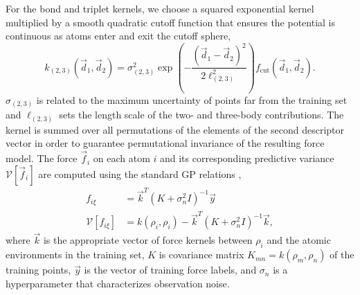 \documentclass[%
superscriptaddress,
preprint,
linenumbers,
amsmath,amssymb,
aps,
prl,
]{revtex4-1}
\begin{document}
For the bond and triplet kernels, we choose a squared exponential kernel multiplied by a smooth quadratic cutoff function that ensures the potential is continuous as atoms enter and exit the cutoff sphere,
\begin{equation}
k_{(2, 3)}(\vec{d}_1, \vec{d}_2) = \sigma_{(2, 3)}^2 \exp\left(- \frac{(\vec{d}_1 - \vec{d}_2)^2}{2 \ell_{(2,3)}^2} \right) f_{\text{cut}}(\vec{d}_1, \vec{d}_2).
\end{equation}
$\sigma_{(2, 3)}$ is related to the maximum uncertainty of points far from the training set and $\ell_{(2 ,3)}$ sets the length scale of the two- and three-body contributions. The kernel is summed over all permutations of the elements of the second descriptor vector in order to guarantee permutational invariance of the resulting force model. The force $\vec{f}_i$ on each atom $i$ and its corresponding predictive variance $\mathcal{V}[\vec{f}_i]$ are computed using the standard GP relations \cite{rasmussen2003gaussian},
\begin{equation}
	\begin{split}
f_{i\xi} &= \vec{k}^{T} \left(K + \sigma_n^2 I \right)^{-1} \vec{y} \\
\mathcal{V}[f_{i\xi}] &= k(\rho_i, \rho_i) - \vec{k}^{T} \left(K + \sigma_n^2 I \right)^{-1} \vec{k},
	\end{split}
\end{equation}
where $\vec{k}$ is the appropriate vector of force kernels between $\rho_i$ and the atomic environments in the training set, $K$ is covariance matrix $K_{mn} = k(\rho_m, \rho_n)$ of the training points, $\vec{y}$ is the vector of training force labels, and $\sigma_n$ is a hyperparameter that characterizes observation noise.
\end{document}
